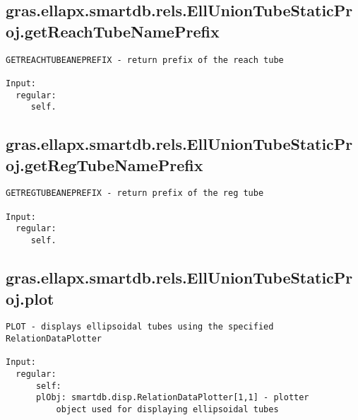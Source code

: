 \subsection{\texorpdfstring{gras.ellapx.smartdb.rels.EllUnionTubeStaticProj.getReachTubeNamePrefix}{getReachTubeNamePrefix}}\label{method:gras.ellapx.smartdb.rels.EllUnionTubeStaticProj.getReachTubeNamePrefix}
\begin{verbatim}
GETREACHTUBEANEPREFIX - return prefix of the reach tube

Input:
  regular:
     self.
\end{verbatim}
\subsection{\texorpdfstring{gras.ellapx.smartdb.rels.EllUnionTubeStaticProj.getRegTubeNamePrefix}{getRegTubeNamePrefix}}\label{method:gras.ellapx.smartdb.rels.EllUnionTubeStaticProj.getRegTubeNamePrefix}
\begin{verbatim}
GETREGTUBEANEPREFIX - return prefix of the reg tube

Input:
  regular:
     self.
\end{verbatim}
\subsection{\texorpdfstring{gras.ellapx.smartdb.rels.EllUnionTubeStaticProj.plot}{plot}}\label{method:gras.ellapx.smartdb.rels.EllUnionTubeStaticProj.plot}
\begin{verbatim}
PLOT - displays ellipsoidal tubes using the specified RelationDataPlotter

Input:
  regular:
      self:
      plObj: smartdb.disp.RelationDataPlotter[1,1] - plotter
          object used for displaying ellipsoidal tubes
\end{verbatim}
